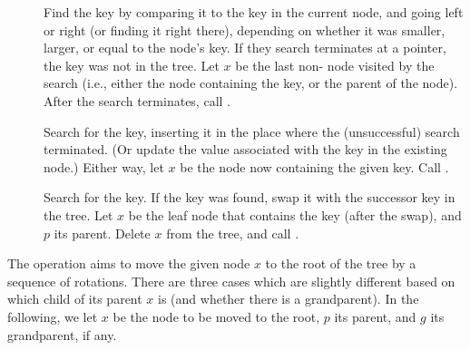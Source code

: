 \begin{description}
\item[] Find the key by comparing it to the key in
  the current node, and going left or right (or finding it right
  there), depending on whether it was smaller, larger, or equal to the
  node's key. If they search terminates at a  pointer, the
  key was not in the tree. Let $x$ be the last non- node
  visited by the search (i.e., either the node containing the key, or
  the parent of the  node). After the search terminates,
  call .
\item[] Search for the key, inserting it in
  the place where the (unsuccessful) search terminated. (Or update the
  value associated with the key in the existing node.) Either way, let
  $x$ be the node now containing the given key. Call .
\item[] Search for the key. If the key was found,
  swap it with the successor key in the tree. Let $x$ be the leaf node
  that contains the key (after the swap), and $p$ its parent. Delete
  $x$ from the tree, and call .
\end{description}

The  operation aims to move the given node $x$ to the root
of the tree by a sequence of rotations. There are three cases which
are slightly different based on which child of its parent $x$ is (and
whether there is a grandparent). In the following, we let $x$ be the
node to be moved to the root, $p$ its parent, and $g$ its grandparent,
if any.

